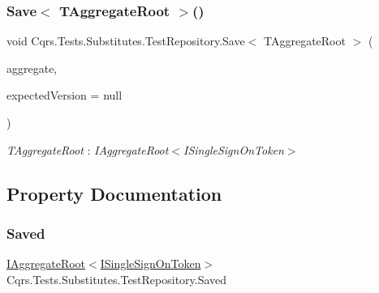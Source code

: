 \subsubsection{\texorpdfstring{Save$<$ T\+Aggregate\+Root $>$()}{Save< TAggregateRoot >()}}
{\footnotesize\ttfamily void Cqrs.\+Tests.\+Substitutes.\+Test\+Repository.\+Save$<$ T\+Aggregate\+Root $>$ (\begin{DoxyParamCaption}\item[{T\+Aggregate\+Root}]{aggregate,  }\item[{int?}]{expected\+Version = {\ttfamily null} }\end{DoxyParamCaption})}

\begin{Desc}
\item[Type Constraints]\begin{description}
\item[{\em T\+Aggregate\+Root} : {\em I\+Aggregate\+Root$<$I\+Single\+Sign\+On\+Token$>$}]\end{description}
\end{Desc}


\subsection{Property Documentation}
\mbox{\label{classCqrs_1_1Tests_1_1Substitutes_1_1TestRepository_ab0948780928642027f86a02c74d010d0}} 
\subsubsection{\texorpdfstring{Saved}{Saved}}
{\footnotesize\ttfamily \hyperlink{interfaceCqrs_1_1Domain_1_1IAggregateRoot}{I\+Aggregate\+Root}$<$\hyperlink{interfaceCqrs_1_1Authentication_1_1ISingleSignOnToken}{I\+Single\+Sign\+On\+Token}$>$ Cqrs.\+Tests.\+Substitutes.\+Test\+Repository.\+Saved\hspace{0.3cm}{\ttfamily [get]}}

